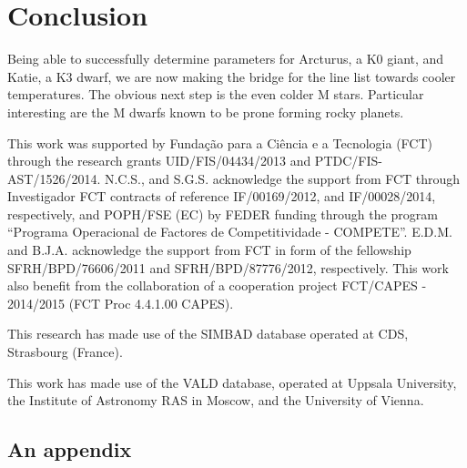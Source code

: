 \documentclass{aa}
\begin{document}
\section{Conclusion}
\label{sec:conclusion}
Being able to successfully determine parameters for Arcturus, a K0 giant,
and Katie, a K3 dwarf,
we are now making the bridge for the line list towards cooler temperatures.
The obvious next step is the even colder M stars. Particular interesting
are the M dwarfs known to be prone forming rocky planets.





\begin{acknowledgements}

This work was supported by Funda\c{c}\~ao para a Ci\^encia e a
Tecnologia (FCT) through the research grants UID/FIS/04434/2013 and
PTDC/FIS-AST/1526/2014. N.C.S., and S.G.S. acknowledge the support from
FCT through Investigador FCT contracts of reference IF/00169/2012, and
IF/00028/2014, respectively, and POPH/FSE (EC) by FEDER funding through
the program “Programa Operacional de Factores de Competitividade
- COMPETE”. E.D.M. and B.J.A. acknowledge the support from FCT in
form of the fellowship SFRH/BPD/76606/2011 and SFRH/BPD/87776/2012,
respectively. This work also benefit from the collaboration of a
cooperation project FCT/CAPES - 2014/2015 (FCT Proc 4.4.1.00 CAPES).

This research has made use of the SIMBAD database operated at CDS,
Strasbourg (France).

This work has made use of the VALD database, operated at Uppsala
University, the Institute of Astronomy RAS in Moscow, and the University
of Vienna.

\end{acknowledgements}






\begin{appendix}
\section{An appendix}


\end{appendix}
\end{document}
